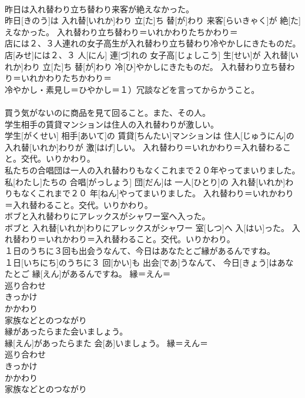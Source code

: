 \documentclass[8pt]{extreport}
\begin{document}
\begin{CJK}{UTF8}{min}
{\\	昨日は入れ替わり立ち替わり来客が絶えなかった。	
\\	昨日[きのう]は 入れ替[いれか]わり 立[た]ち 替[が]わり 来客[らいきゃく]が 絶[た]えなかった。	入れ替わり立ち替わり＝いれかわりたちかわり＝ 
\\	店には２、３人連れの女子高生が入れ替わり立ち替わり冷やかしにきたものだ。	
\\	店[みせ]には２、３ 人[にん] 連[づ]れの 女子高[じょしこう] 生[せい]が 入れ替[いれか]わり 立[た]ち 替[が]わり 冷[ひ]やかしにきたものだ。	入れ替わり立ち替わり＝いれかわりたちかわり＝ 
\\	冷やかし・素見し＝ひやかし＝１）冗談などを言ってからかうこと。 　　　　　　　　　　　　　　
\\	買う気がないのに商品を見て回ること。また、その人。
\\	学生相手の賃貸マンションは住人の入れ替わりが激しい。	
\\	学生[がくせい] 相手[あいて]の 賃貸[ちんたい]マンションは 住人[じゅうにん]の 入れ替[いれか]わりが 激[はげ]しい。	入れ替わり＝いれかわり＝入れ替わること。交代。いりかわり。
\\	私たちの合唱団は一人の入れ替わりもなくこれまで２０年やってまいりました。	
\\	私[わたし]たちの 合唱[がっしょう] 団[だん]は 一人[ひとり]の 入れ替[いれか]わりもなくこれまで２０ 年[ねん]やってまいりました。	入れ替わり＝いれかわり＝入れ替わること。交代。いりかわり。
\\	ボブと入れ替わりにアレックスがシャワー室へ入った。	
\\	ボブと 入れ替[いれか]わりにアレックスがシャワー 室[しつ]へ 入[はい]った。	入れ替わり＝いれかわり＝入れ替わること。交代。いりかわり。
\\	１日のうちに３回も出会うなんて、今日はあなたとご縁があるんですね。	
\\	１日[いちにち]のうちに３ 回[かい]も 出会[であ]うなんて、 今日[きょう]はあなたとご 縁[えん]があるんですね。	縁＝えん＝ 
\\	巡り合わせ
\\	きっかけ
\\	かかわり
\\	家族などとのつながり
\\	縁があったらまた会いましょう。	
\\	縁[えん]があったらまた 会[あ]いましょう。	縁＝えん＝ 
\\	巡り合わせ
\\	きっかけ
\\	かかわり
\\	家族などとのつながり
}
\end{CJK}
\end{document}
